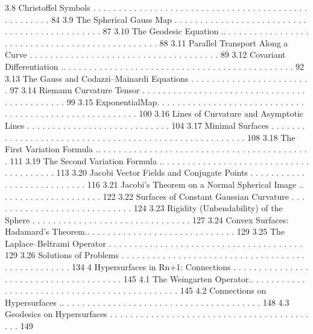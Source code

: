 \documentclass[a4paper,10pt]{article}
\begin{document}
3.8 Christoffel Symbols . . . . . . . . . . . . . . . . . . . . . . . . . . . . . . . . . . . . . . . . . . . . . . . . . . . 84
3.9 The Spherical Gauss Map . . . . . . . . . . . . . . . . . . . . . . . . . . . . . . . . . . . . . . . . . . . . . 87
3.10 The Geodesic Equation .. . . . . . . . . . . . . . . . . . . . . . . . . . . . . . . . . . . . . . . . . . . . . . . 88
3.11 Parallel Transport Along a Curve . . . . . . . . . . . . . . . . . . . . . . . . . . . . . . . . . . . . . 89
3.12 Covariant Differentiation .. . . . . . . . . . . . . . . . . . . . . . . . . . . . . . . . . . . . . . . . . . . . . 92
3.13 The Gauss and Codazzi–Mainardi Equations . . . . . . . . . . . . . . . . . . . . . . . . 97
3.14 Riemann Curvature Tensor . . . . . . . . . . . . . . . . . . . . . . . . . . . . . . . . . . . . . . . . . . . . 99
3.15 ExponentialMap. . . . . . . . . . . . . . . . . . . . . . . . . . . . . . . . . . . . . . . . . . . . . . . . . . . . . . . 100
3.16 Lines of Curvature and Asymptotic Lines . . . . . . . . . . . . . . . . . . . . . . . . . . . . 104
3.17 Minimal Surfaces . . . . . . . . . . . . . . . . . . . . . . . . . . . . . . . . . . . . . . . . . . . . . . . . . . . . . . 108
3.18 The First Variation Formula .. . . . . . . . . . . . . . . . . . . . . . . . . . . . . . . . . . . . . . . . . . 111
3.19 The Second Variation Formula .. . . . . . . . . . . . . . . . . . . . . . . . . . . . . . . . . . . . . . . 113
3.20 Jacobi Vector Fields and Conjugate Points . . . . . . . . . . . . . . . . . . . . . . . . . . . 116
3.21 Jacobi’s Theorem on a Normal Spherical Image .. . . . . . . . . . . . . . . . . . . . 122
3.22 Surfaces of Constant Gaussian Curvature . . . . . . . . . . . . . . . . . . . . . . . . . . . . 124
3.23 Rigidity (Unbendability) of the Sphere . . . . . . . . . . . . . . . . . . . . . . . . . . . . . . . 127
3.24 Convex Surfaces: Hadamard’s Theorem.. . . . . . . . . . . . . . . . . . . . . . . . . . . . . 129
3.25 The Laplace–Beltrami Operator . . . . . . . . . . . . . . . . . . . . . . . . . . . . . . . . . . . . . . 129
3.26 Solutions of Problems . . . . . . . . . . . . . . . . . . . . . . . . . . . . . . . . . . . . . . . . . . . . . . . . . 134
4 Hypersurfaces in Rn+1: Connections . . . . . . . . . . . . . . . . . . . . . . . . . . . . . . . . . . . . . . 145
4.1 The Weingarten Operator.. . . . . . . . . . . . . . . . . . . . . . . . . . . . . . . . . . . . . . . . . . . . . 145
4.2 Connections on Hypersurfaces .. . . . . . . . . . . . . . . . . . . . . . . . . . . . . . . . . . . . . . . 148
4.3 Geodesics on Hypersurfaces . . . . . . . . . . . . . . . . . . . . . . . . . . . . . . . . . . . . . . . . . . 149
\end{document}

